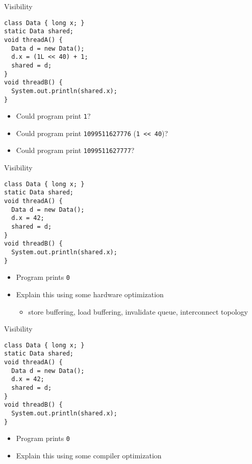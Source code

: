 \begin{frame}{Visibility}

\begin{verbatim}
class Data { long x; }
static Data shared;
void threadA() {
  Data d = new Data();
  d.x = (1L << 40) + 1;
  shared = d;
}
void threadB() {
  System.out.println(shared.x);
}
\end{verbatim}

\begin{itemize}
  \pause \item Could program print \texttt{1}?
  \pause \item Could program print \texttt{1099511627776} (\texttt{1 << 40})?
  \pause \item Could program print \texttt{1099511627777}?
\end{itemize}

\end{frame}

\begin{frame}{Visibility}

\begin{verbatim}
class Data { long x; }
static Data shared;
void threadA() {
  Data d = new Data();
  d.x = 42;
  shared = d;
}
void threadB() {
  System.out.println(shared.x);
}
\end{verbatim}

\pause

\begin{itemize}
  \item Program prints \texttt{0}
  \item Explain this using some hardware optimization 
  \begin{itemize}
    \item store buffering, load buffering, invalidate queue, interconnect topology
  \end{itemize}
\end{itemize}
\end{frame}


\begin{frame}{Visibility}
\begin{verbatim}
class Data { long x; }
static Data shared;
void threadA() {
  Data d = new Data();
  d.x = 42;
  shared = d;
}
void threadB() {
  System.out.println(shared.x);
}
\end{verbatim}


\begin{itemize}
  \item Program prints \texttt{0}
  \item Explain this using some compiler optimization
\end{itemize}
\end{frame}



